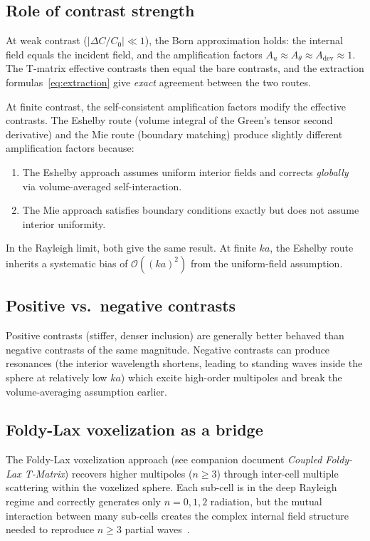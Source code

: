 \documentclass[11pt,a4paper]{article}
\newcommand{\order}[1]{\mathcal{O}\!\left(#1\right)}
\begin{document}
\subsection{Role of contrast strength}

At weak contrast ($|\Delta C/C_0| \ll 1$), the Born approximation
holds: the internal field equals the incident field, and the
amplification factors $A_u \approx A_\theta \approx A_\text{dev}
\approx 1$.  The T-matrix effective contrasts then equal the bare
contrasts, and the extraction formulas~\eqref{eq:extraction} give
\emph{exact} agreement between the two routes.

At finite contrast, the self-consistent amplification factors
modify the effective contrasts.  The Eshelby route (volume integral
of the Green's tensor second derivative) and the Mie route
(boundary matching) produce slightly different amplification
factors because:
\begin{enumerate}
  \item The Eshelby approach assumes uniform interior fields and
    corrects \emph{globally} via volume-averaged self-interaction.
  \item The Mie approach satisfies boundary conditions exactly but
    does not assume interior uniformity.
\end{enumerate}
In the Rayleigh limit, both give the same result.  At finite $ka$,
the Eshelby route inherits a systematic bias of $\order{(ka)^2}$
from the uniform-field assumption.

\subsection{Positive vs.\ negative contrasts}

Positive contrasts (stiffer, denser inclusion) are generally better
behaved than negative contrasts of the same magnitude.  Negative
contrasts can produce resonances (the interior wavelength shortens,
leading to standing waves inside the sphere at relatively low $ka$)
which excite high-order multipoles and break the volume-averaging
assumption earlier.

\subsection{Foldy-Lax voxelization as a bridge}

The Foldy-Lax voxelization approach (see companion document
\emph{Coupled Foldy-Lax T-Matrix}) recovers higher multipoles
($n \geq 3$) through inter-cell multiple scattering within the
voxelized sphere.  Each sub-cell is in the deep Rayleigh regime
and correctly generates only $n = 0, 1, 2$ radiation, but the
mutual interaction between many sub-cells creates the complex
internal field structure needed to reproduce $n \geq 3$ partial
waves~\cite{Foldy1945,Lax1951,Lax1952}.
\end{document}
